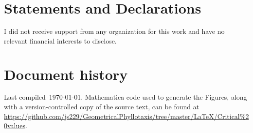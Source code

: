 \documentclass[a4paper,10pt]{amsart}
\begin{document}
\section*{Statements and Declarations} 
I did not receive support from any organization for this work and have no relevant financial interests to disclose. 

\printbibliography
\section{Document history}
Last compiled\ \today.
 Mathematica code used to generate the Figures, along with a version-controlled copy of the source text, can be found at \url{https://github.com/js229/GeometricalPhyllotaxis/tree/master/LaTeX/Critical%20values}.
\end{document}
